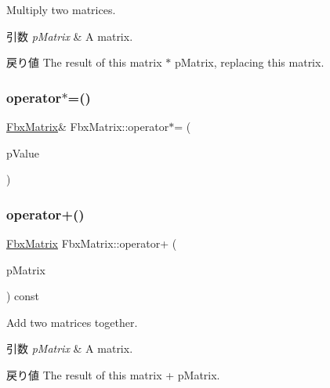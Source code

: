 Multiply two matrices. 
\begin{DoxyParams}{引数}
{\em p\+Matrix} & A matrix. \\
\hline
\end{DoxyParams}
\begin{DoxyReturn}{戻り値}
The result of this matrix $\ast$ p\+Matrix, replacing this matrix. 
\end{DoxyReturn}
\mbox{\label{class_fbx_matrix_a29c75e711021d29d9b046f7f0b5119cf}} 
\subsubsection{\texorpdfstring{operator$\ast$=()}{operator*=()}\hspace{0.1cm}{\footnotesize\ttfamily [2/2]}}
{\footnotesize\ttfamily \hyperlink{class_fbx_matrix}{Fbx\+Matrix}\& Fbx\+Matrix\+::operator$\ast$= (\begin{DoxyParamCaption}\item[{\hyperlink{class_fbx_matrix_a01f8be57393e5d9973b23897c29d5520}{double}}]{p\+Value }\end{DoxyParamCaption})}

\mbox{\label{class_fbx_matrix_a34275146ae0b453898798760fe340650}} 
\subsubsection{\texorpdfstring{operator+()}{operator+()}}
{\footnotesize\ttfamily \hyperlink{class_fbx_matrix}{Fbx\+Matrix} Fbx\+Matrix\+::operator+ (\begin{DoxyParamCaption}\item[{const \hyperlink{class_fbx_matrix}{Fbx\+Matrix} \&}]{p\+Matrix }\end{DoxyParamCaption}) const}

Add two matrices together. 
\begin{DoxyParams}{引数}
{\em p\+Matrix} & A matrix. \\
\hline
\end{DoxyParams}
\begin{DoxyReturn}{戻り値}
The result of this matrix + p\+Matrix. 
\end{DoxyReturn}
\mbox{\label{class_fbx_matrix_a9a4f35c24f2907b4d170bbd361d69fa6}} 
